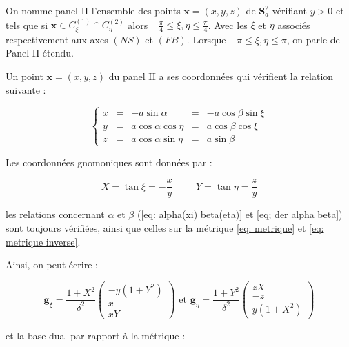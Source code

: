 \begin{definition}
On nomme panel II l'ensemble des points $\mathbf{x}=(x,y,z)$ de $\mathbf{S}_a^2$ vérifiant $y>0$ et tels que si $\mathbf{x} \in C_{\xi}^{(1)} \cap C_{\eta}^{(2)}$ alors $-\frac{\pi}{4}\leq \xi,\eta \leq \frac{\pi}{4}$. Avec les $\xi$ et $\eta$ associés respectivement aux axes $(NS)$ et $(FB)$. Lorsque $-\pi \leq \xi,\eta \leq \pi$, on parle de Panel II étendu.
\end{definition}

Un point $\mathbf{x}=(x,y,z)$ du panel II a ses coordonnées qui vérifient la relation suivante :

\begin{equation}
\left\lbrace
\begin{array}{rcccc}
x & = & - a \sin \alpha & = & - a \cos \beta \sin \xi \\
y & = & a \cos \alpha \cos \eta & = & a \cos \beta \cos \xi \\
z & = & a \cos \alpha \sin \eta & = & a \sin \beta
\end{array}
\right.
\end{equation}

Les coordonnées gnomoniques sont données par :

\begin{equation}
X = \tan \xi = - \dfrac{x}{y} \hspace{1cm} Y = \tan \eta = \dfrac{z}{y}
\end{equation}

les relations concernant $\alpha$ et $\beta$ (\eqref{eq: alpha(xi) beta(eta)} et \eqref{eq; der alpha beta}) sont toujours vérifiées, ainsi que celles sur la métrique \eqref{eq: metrique} et \eqref{eq: metrique inverse}.

Ainsi, on peut écrire : 

\begin{equation}
\mathbf{g}_{\xi} = \dfrac{1+X^2}{\delta^2} \begin{pmatrix}
-y(1+Y^2) \\ x \\ xY
\end{pmatrix} \text{ et } \mathbf{g}_{\eta} = \dfrac{1+Y^2}{\delta^2} \begin{pmatrix}
zX \\ -z \\ y(1+X^2)
\end{pmatrix}
\label{eq: base locale II}
\end{equation}

et la base dual par rapport à la métrique :

